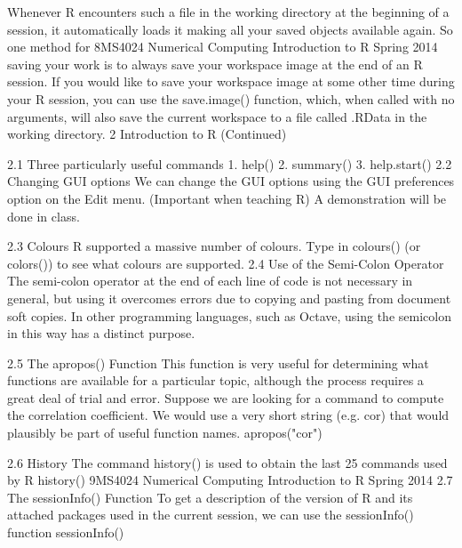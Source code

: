 \documentclass{beamer}
\begin{document}
\begin{frame}
Whenever R encounters such a file in the working directory at the beginning of a session,
it automatically loads it making all your saved objects available again. So one method for
8MS4024 Numerical Computing Introduction to R Spring 2014
saving your work is to always save your workspace image at the end of an R session. If you
would like to save your workspace image at some other time during your R session, you can use
the save.image() function, which, when called with no arguments, will also save the current
workspace to a file called .RData in the working directory.
2 Introduction to R (Continued)
\end{frame}
\begin{frame}
2.1 Three particularly useful commands
1. help()
2. summary()
3. help.start()
2.2 Changing GUI options
We can change the GUI options using the GUI preferences option on the Edit menu. (Important
when teaching R) A demonstration will be done in class.
\end{frame}
\begin{frame}

2.3 Colours
R supported a massive number of colours. Type in colours() (or colors()) to see what colours
are supported.
2.4 Use of the Semi-Colon Operator
The semi-colon operator at the end of each line of code is not necessary in general, but using it
overcomes errors due to copying and pasting from document soft copies. In other programming
languages, such as Octave, using the semicolon in this way has a distinct purpose.
\end{frame}
\begin{frame}
2.5 The apropos() Function
This function is very useful for determining what functions are available for a particular topic,
although the process requires a great deal of trial and error. Suppose we are looking for a
command to compute the correlation coefficient. We would use a very short string (e.g. cor)
that would plausibly be part of useful function names.
apropos("cor")
\end{frame}
\begin{frame}

2.6 History
The command history() is used to obtain the last 25 commands used by R
history()
9MS4024 Numerical Computing Introduction to R Spring 2014
2.7 The sessionInfo() Function
To get a description of the version of R and its attached packages used in the current session,
we can use the sessionInfo() function
sessionInfo()
\end{frame}
\end{document}
